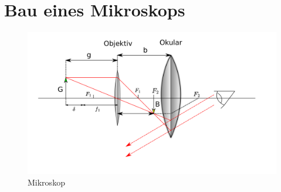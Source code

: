 \section{Bau eines Mikroskops}

\begin{figure}
    \centering
    \includegraphics[scale=0.8]{Geometrische_Optik/Protokoll/fig/Mikroskop.png}
    \caption{Mikroskop}
    \label{fig:Mikroskop}
\end{figure}